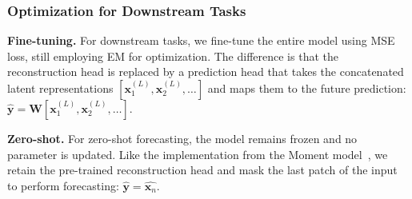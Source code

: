 





\subsubsection{Optimization for Downstream Tasks}


\noindent\textbf{Fine-tuning.} For downstream tasks, we fine-tune the entire model using MSE loss, still employing EM for optimization. The difference is that the reconstruction head is replaced by a prediction head that takes the concatenated latent representations $[\mathbf{x}_1^{(L)}, \mathbf{x}_2^{(L)}, \ldots ]$ and maps them to the future prediction:
$\hat{\mathbf{y}} = \mathbf{W}[\mathbf{x}_1^{(L)}, \mathbf{x}_2^{(L)}, \ldots]$.


\noindent\textbf{Zero-shot.} For zero-shot forecasting, the model remains frozen and no parameter is updated. Like the implementation from the Moment model~\cite{goswami2024moment}, we retain the pre-trained reconstruction head and mask the last patch of the input to perform forecasting: $\hat{\mathbf{y}} = \hat{\mathbf{x}_n}$.


